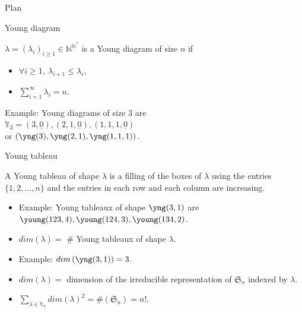 \documentclass[english,xcolor=table]{beamer}
\begin{document}
\begin{frame}{Plan}
\tableofcontents[currentsection,currentsubsection,
    hideothersubsections, 
    sectionstyle=show/shaded,
]
\end{frame}
\begin{frame}{Young diagram}
   \begin{definition}
   $\lambda=(\lambda_i)_{i\geq1} \in \mathbb{N}^{\mathbb{N}^*}$ is a Young diagram of size $n$ if 
   \begin{itemize}
       \item $\forall i\geq1, \  \lambda_{i+1}\leq \lambda_i$,
       \item $\sum_{i=1}^\infty \lambda_i=n$.
   \end{itemize}
   \end{definition}
   \vspace{10 mm}

   Example:  Young diagrams of size 3 are   \\ $\mathbb{Y}_3=(3,\underline{0}),(2,1,\underline{0}),(1,1,1,\underline{0})$
   \\   or $\left(\yng(3),\yng(2,1),\yng(1,1,1)\right)$.
   
 
\end{frame}


\begin{frame}{Young tableau}
    \begin{definition}
    A Young tableau of shape $\lambda$ is a filling of the boxes of $\lambda$ using the entries $\{1,2,\dots,n\}$ and the entries in each row and each column are increasing.
    \end{definition}
    \begin{itemize}
        \item     Example: Young tableaux of shape $\yng(3,1)$ are $\young(123,4),\young(124,3),\young(134,2)$. 
    \item$dim(\lambda)=$ \# Young tableaux of shape $\lambda$. 
    \item Example: $dim\left(\yng(3,1)\right)=3$.
    \item $dim(\lambda) = $   dimension of the irreducible representation of  $\mathfrak{S}_n$ indexed by $\lambda$.
     \item $\sum_{\lambda \in \mathbb{Y}_n} dim(\lambda)^2=\#(\mathfrak{S}_n)=n!$.
    \end{itemize}
 \end{frame}
\end{document}
